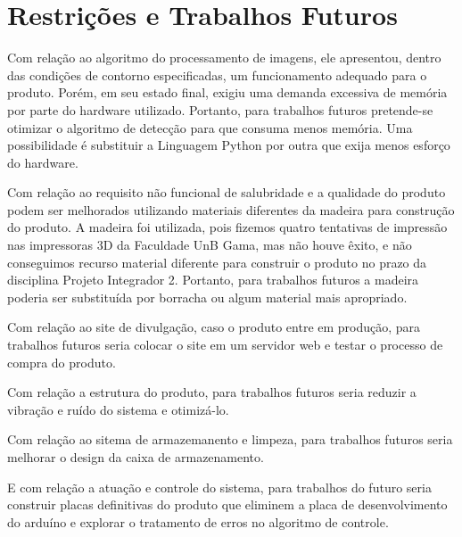 
\chapter[Restrições e Trabalhos Futuros]{Restrições e Trabalhos Futuros}


Com relação ao algoritmo do processamento de imagens, ele apresentou, dentro das condições de contorno especificadas, um funcionamento adequado para o produto. Porém, em seu estado final, exigiu uma demanda excessiva de memória por parte do hardware utilizado. Portanto, para trabalhos futuros pretende-se otimizar o algoritmo de detecção para que consuma menos memória. Uma possibilidade é substituir a Linguagem Python por outra que exija menos esforço do hardware.

Com relação ao requisito não funcional de salubridade e a qualidade do produto podem ser melhorados utilizando materiais diferentes da madeira para construção do produto. A madeira foi utilizada, pois fizemos quatro tentativas de impressão nas impressoras 3D da Faculdade UnB Gama, mas não houve êxito, e não conseguimos recurso material diferente para construir o produto no prazo da disciplina Projeto Integrador 2. Portanto, para trabalhos futuros a madeira poderia ser substituída por borracha ou algum material mais apropriado.

Com relação ao site de divulgação, caso o produto entre em produção, para trabalhos futuros seria colocar o site em um servidor web e testar o processo de compra do produto.

Com relação a estrutura do produto, para trabalhos futuros seria reduzir a vibração e ruído do sistema e otimizá-lo.

Com relação ao sitema de armazemanento e limpeza, para trabalhos futuros seria melhorar o design da caixa de armazenamento.

E com relação a atuação e controle do sistema, para trabalhos do futuro seria construir placas definitivas do produto que eliminem a placa de desenvolvimento do arduíno e explorar o tratamento de erros no algoritmo de controle. 